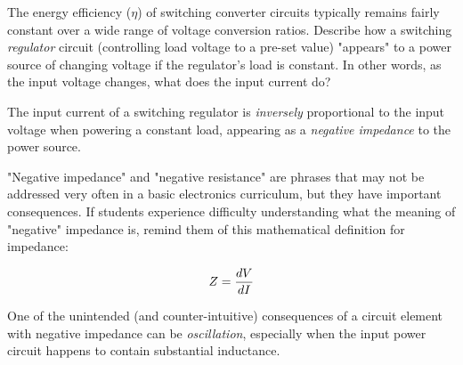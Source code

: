 

The energy efficiency ($\eta$) of switching converter circuits typically remains fairly constant over a wide range of voltage conversion ratios.  Describe how a switching {\it regulator} circuit (controlling load voltage to a pre-set value) "appears" to a power source of changing voltage if the regulator's load is constant.  In other words, as the input voltage changes, what does the input current do?







The input current of a switching regulator is {\it inversely} proportional to the input voltage when powering a constant load, appearing as a {\it negative impedance} to the power source.







"Negative impedance" and "negative resistance" are phrases that may not be addressed very often in a basic electronics curriculum, but they have important consequences.  If students experience difficulty understanding what the meaning of "negative" impedance is, remind them of this mathematical definition for impedance:

$$Z = {dV \over dI}$$

One of the unintended (and counter-intuitive) consequences of a circuit element with negative impedance can be {\it oscillation}, especially when the input power circuit happens to contain substantial inductance.




